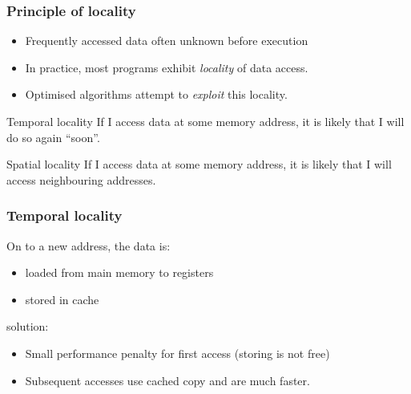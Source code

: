 \documentclass[dvipsnames,presentation,aspectratio=169,14pt]{beamer}
\begin{document}
\begin{frame}
  \frametitle{Principle of locality}
  \begin{itemize}
  \item Frequently accessed data often unknown before execution
  \item In practice, most programs exhibit \emph{locality} of data
    access.
  \item Optimised algorithms attempt to \emph{exploit} this
    locality.
  \end{itemize}

  \pause

  \begin{block}{Temporal locality}
    If I access data at some memory address, it is likely that I will
    do so again ``soon''.
  \end{block}

  \vskip -2pt

  \begin{block}{Spatial locality}
    If I access data at some memory address, it is likely that I will
    access neighbouring addresses.
  \end{block}
\end{frame}

\begin{frame}
  \frametitle{Temporal locality}

  On  to a new address, the data is:\\[-13pt]
  \begin{itemize}[itemsep=6pt]
  \item loaded from main memory to registers
  \item stored in cache
  \end{itemize}

  \vskip 20pt
  \pause

   solution:\\[-13pt]
  \begin{itemize}[itemsep=6pt]
  \item Small performance penalty for first access (storing is not free)
  \item Subsequent accesses use cached copy and are much faster.
  \end{itemize}
\end{frame}
\end{document}
